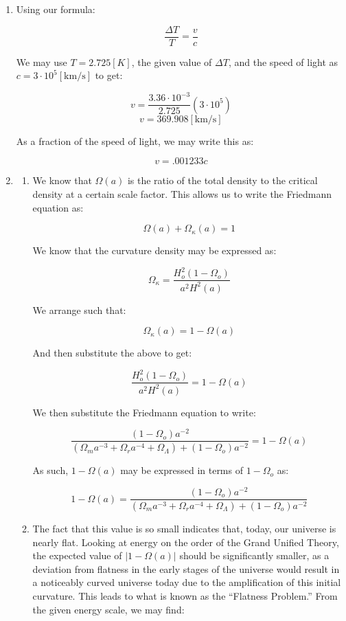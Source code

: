 \begin{enumerate}

  \item Using our formula:

    $$\frac{\Delta T}{T}=\frac{v}{c}$$

    We may use $T=2.725[\si{K}]$, the given value of $\Delta T$, and the speed of light as $c=3\cdot10^5[\si{\km\per\second}]$ to get:

    $$v=\frac{3.36\cdot10^{-3}}{2.725}(3\cdot10^5)$$
    $$\boxed{v=369.908[\si{\kilo\meter\per\second}]}$$

    As a fraction of the speed of light, we may write this as:

    $$\boxed{v=.001233c}$$

  \item

    \begin{enumerate}

      \item We know that $\Omega(a)$ is the ratio of the total density to the critical density at a certain scale factor. This allows us to write the Friedmann equation as:

        $$\Omega(a)+\Omega_{\kappa}(a)=1$$

        We know that the curvature density may be expressed as:

        $$\Omega_{\kappa}=\frac{H_o^2(1-\Omega_o)}{a^2H^2(a)}$$

        We arrange such that:

        $$\Omega_{\kappa}(a)=1-\Omega(a)$$

        And then substitute the above to get:

        $$\frac{H_o^2(1-\Omega_o)}{a^2H^2(a)}=1-\Omega(a)$$

        We then substitute the Friedmann equation to write:

        $$\frac{(1-\Omega_o)a^{-2}}{(\Omega_ma^{-3}+\Omega_ra^{-4}+\Omega_{\Lambda})+(1-\Omega_o)a^{-2}}=1-\Omega(a)$$

        As such, $1-\Omega(a)$ may be expressed in terms of $1-\Omega_o$ as:

        $$\boxed{1-\Omega(a)=\frac{(1-\Omega_o)a^{-2}}{(\Omega_ma^{-3}+\Omega_ra^{-4}+\Omega_{\Lambda})+(1-\Omega_o)a^{-2}}}$$

      \item The fact that this value is so small indicates that, today, our universe is nearly flat. Looking at energy on the order of the Grand Unified Theory, the expected value of $|1-\Omega(a)|$ should be significantly smaller, as a deviation from flatness in the early stages of the universe would result in a noticeably curved universe today due to the amplification of this initial curvature. This leads to what is known as the ``Flatness Problem.'' From the given energy scale, we may find:


\end{enumerate}
\end{enumerate}

